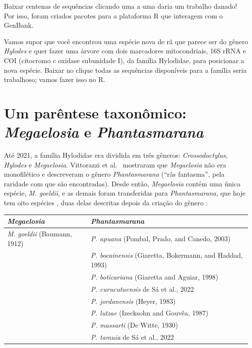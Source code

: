 \documentclass[11pt,a4paper]{article}
\begin{document}
Baixar centenas de sequências clicando uma a uma daria um trabalho danado! Por isso, foram
criados pacotes para a plataforma R que interagem com o GenBank.

Vamos supor que você encontrou uma espécie nova de rã que parece ser do gênero \emph{Hylodes} e
quer fazer uma árvore com dois marcadores mitocondriais, 16S rRNA e COI (citocromo c oxidase
subunidade I), da família Hylodidae, para posicionar a nova espécie. Baixar no clique todas as
sequências disponíveis para a família seria trabalhoso; vamos fazer isso no R.

\section{Um parêntese taxonômico: \emph{Megaelosia} e \emph{Phantasmarana}}\label{sec:taxonomia}

Até 2021, a família Hylodidae era dividida em três gêneros: \emph{Crossodactylus},
\emph{Hylodes} e \emph{Megaelosia}. Vittorazzi et al.\ \cite{vittorazzi2021} mostraram que
\emph{Megaelosia} não era monofilético e descreveram o gênero \emph{Phantasmarana} (``rãs
fantasma'', pela raridade com que são encontradas). Desde então, \emph{Megaelosia} contém uma
única espécie, \emph{M. goeldii}, e as demais foram transferidas para \emph{Phantasmarana}, que
hoje tem oito espécies \cite{asw}, duas delas descritas depois da criação do gênero
\cite{desa2022}:

\begin{center}
\begin{tabular}{@{}ll@{}}
\toprule
\emph{Megaelosia} & \emph{Phantasmarana} \\
\midrule
\emph{M. goeldii} (Baumann, 1912) & \emph{P. apuana} (Pombal, Prado, and Canedo, 2003) \\
 & \emph{P. bocainensis} (Giaretta, Bokermann, and Haddad, 1993) \\
 & \emph{P. boticariana} (Giaretta and Aguiar, 1998) \\
 & \emph{P. curucutuensis} de Sá et al., 2022 \\
 & \emph{P. jordanensis} (Heyer, 1983) \\
 & \emph{P. lutzae} (Izecksohn and Gouvêa, 1987) \\
 & \emph{P. massarti} (De Witte, 1930) \\
 & \emph{P. tamuia} de Sá et al., 2022 \\
\bottomrule
\end{tabular}
\end{center}
\end{document}
